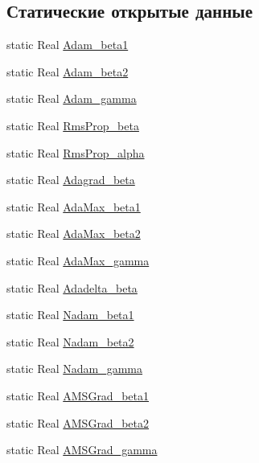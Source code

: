 \subsection*{Статические открытые данные}
\begin{DoxyCompactItemize}
\item 
static Real \mbox{\hyperlink{structParameters_a8c6cd65deec4169ae0cdefffcb8e2252}{Adam\+\_\+beta1}}
\item 
static Real \mbox{\hyperlink{structParameters_a2a80a92cc9f7a7748293b1aee8eb44d9}{Adam\+\_\+beta2}}
\item 
static Real \mbox{\hyperlink{structParameters_a16a784f47a8334f61e84429b4397f179}{Adam\+\_\+gamma}}
\item 
static Real \mbox{\hyperlink{structParameters_accecb0c309434afde3b2ae24e90a5740}{Rms\+Prop\+\_\+beta}}
\item 
static Real \mbox{\hyperlink{structParameters_ac50274e2816fd25aeee99e23891c5b2e}{Rms\+Prop\+\_\+alpha}}
\item 
static Real \mbox{\hyperlink{structParameters_a9fc2748adaa357bf6e4ad14bcd86ade9}{Adagrad\+\_\+beta}}
\item 
static Real \mbox{\hyperlink{structParameters_a6933336b29f335b8ac36a4911abda94b}{Ada\+Max\+\_\+beta1}}
\item 
static Real \mbox{\hyperlink{structParameters_ae820275a1b04e2241862fa9141d3fd29}{Ada\+Max\+\_\+beta2}}
\item 
static Real \mbox{\hyperlink{structParameters_afd6670c75d952d6e2cdc6e71e197b829}{Ada\+Max\+\_\+gamma}}
\item 
static Real \mbox{\hyperlink{structParameters_a214aefe35044cc9c7782cb9b33dfee2c}{Adadelta\+\_\+beta}}
\item 
static Real \mbox{\hyperlink{structParameters_a284908bd2b8c0870ed3d8b91e9b36ce1}{Nadam\+\_\+beta1}}
\item 
static Real \mbox{\hyperlink{structParameters_a5c13cf58c0e058aabb32fce5077a25ba}{Nadam\+\_\+beta2}}
\item 
static Real \mbox{\hyperlink{structParameters_a5423a84040552a929659b92fbc2a24a9}{Nadam\+\_\+gamma}}
\item 
static Real \mbox{\hyperlink{structParameters_a8f7de16c67faf86be3a0f97987552ced}{A\+M\+S\+Grad\+\_\+beta1}}
\item 
static Real \mbox{\hyperlink{structParameters_a56ae3ad51b4610d5e2fa1f9f96db1a78}{A\+M\+S\+Grad\+\_\+beta2}}
\item 
static Real \mbox{\hyperlink{structParameters_a7d974fd144aa816e6d93a1c8cc666cbc}{A\+M\+S\+Grad\+\_\+gamma}}
\end{DoxyCompactItemize}



